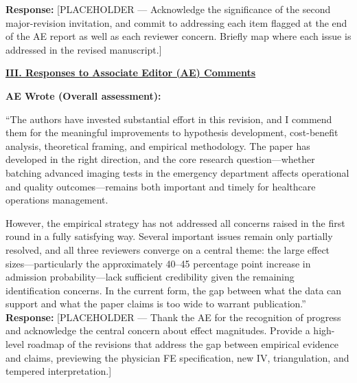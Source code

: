 \documentclass[11pt]{article}
\newenvironment{quote2}
{ \bigskip
\noindent
         \small\em
         \baselineskip=14pt
}
\newcommand{\1}{\hbox{\rm 1\kern-.35em 1}}
\begin{document}
\noindent\textbf{Response:} \color{blue}[PLACEHOLDER --- Acknowledge the significance of the second major-revision invitation, and commit to addressing each item flagged at the end of the AE report as well as each reviewer concern. Briefly map where each issue is addressed in the revised manuscript.]
\color{black}

\clearpage


\pagestyle{fancy}
\fancyhead{}
\renewcommand{\headrulewidth}{0.0pt}

\noindent\underline{\textbf{III. Responses to Associate Editor (AE) Comments}}

\begin{quote2}
\textbf{AE Wrote (Overall assessment):}

\noindent ``The authors have invested substantial effort in this revision, and I commend them for the meaningful improvements to hypothesis development, cost-benefit analysis, theoretical framing, and empirical methodology. The paper has developed in the right direction, and the core research question---whether batching advanced imaging tests in the emergency department affects operational and quality outcomes---remains both important and timely for healthcare operations management.

However, the empirical strategy has not addressed all concerns raised in the first round in a fully satisfying way. Several important issues remain only partially resolved, and all three reviewers converge on a central theme: the large effect sizes---particularly the approximately 40--45 percentage point increase in admission probability---lack sufficient credibility given the remaining identification concerns. In the current form, the gap between what the data can support and what the paper claims is too wide to warrant publication.''
\end{quote2}

\noindent\textbf{Response:} \color{blue}[PLACEHOLDER --- Thank the AE for the recognition of progress and acknowledge the central concern about effect magnitudes. Provide a high-level roadmap of the revisions that address the gap between empirical evidence and claims, previewing the physician FE specification, new IV, triangulation, and tempered interpretation.]
\color{black}
\end{document}
